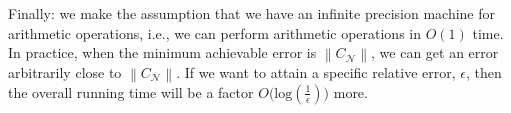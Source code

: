 \documentclass[11pt]{article}
\newcommand{\norm}[1]{\left\|#1\right\|}
\newcommand{\N}{\mathcal{N}}
\newcommand{\0}{\ensuremath{\mathbf{0}}}
\renewcommand{\>}{\succ}
\newcommand{\<}{\prec}
\begin{document}
Finally: we make the assumption that we have an infinite precision machine for arithmetic operations, i.e., we can perform arithmetic operations in $O(1)$ time. In practice, when the minimum achievable error is $\norm{C_{\N}}$, we can get an error arbitrarily close to $\norm{C_{\N}}$. If we want to attain a specific relative error, $\epsilon$,  then the overall running time will be a factor $O\Big(\text{log}(\frac{1}{\epsilon})\Big)$ more.  

\end{document}
